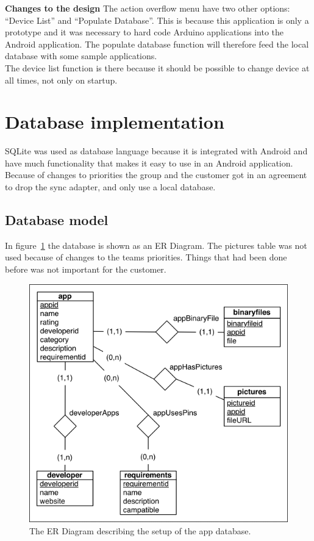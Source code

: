 	\textbf{Changes to the design}
	The action overflow menu have two other options: ``Device List'' and ``Populate Database''. This is because this application is only a prototype and it was necessary to hard code Arduino applications into the Android application. The populate database function will therefore feed the local database with some sample applications.\\

	The device list function is there because it should be possible to change device at all times, not only on startup.\\

\section{Database implementation}

	SQLite was used as database language because it is integrated with Android and have much functionality that makes it easy to use in an Android application. Because of changes to priorities the group and the customer got in an agreement to drop the sync adapter, and only use a local database.

	\subsection{Database model}

		In figure~\ref{fig:erdiagram} the database is shown as an ER Diagram. The pictures table was not used because of changes to the teams priorities. Things that had been done before was not important for the customer.

		\begin{figure}[H]
		\includegraphics[scale=1]{images/ER_Diagram.png}
		\caption[ER Diagram]{The ER Diagram describing the setup of the app database.}
		\label{fig:erdiagram}
		\end{figure}

